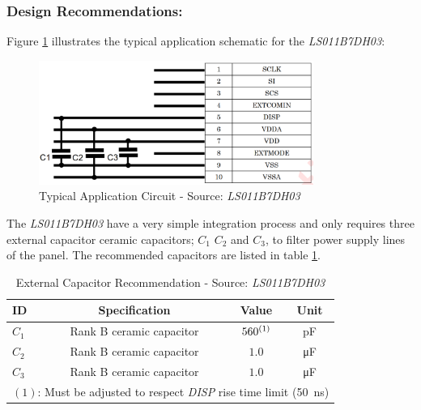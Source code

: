 \documentclass[report.tex]{subfiles}
\begin{document}
\subsubsection{Design Recommendations:}

Figure \ref{fig:LS011B7DH03_ext_capa} illustrates the typical application schematic for the \textit{LS011B7DH03}:

\begin{figure}[H]
	\centering
	\includegraphics[width=0.8\textwidth]{Include/Figure/comp/LS011B7DH03_ext_capa.png}
	\caption{Typical Application Circuit - Source: \textit{LS011B7DH03}\cite{LS011B7DH03}}
	\label{fig:LS011B7DH03_ext_capa}
\end{figure}

The \textit{LS011B7DH03} have a very simple integration process and only requires three external capacitor ceramic capacitors; $C_1$ $C_2$ and $C_3$, to filter power supply lines of the panel. The recommended capacitors are listed in table \ref{tab:LS011B7DH03_cap_recom_tab}.

\begin{table}[H]
\centering
\setlength{\extrarowheight}{2pt}
\begin{tabular}{|l|c|c|c|}\hline
\textbf{ID} & \textbf{Specification} & \textbf{Value} & \textbf{Unit} \\\hline
$C_1$ & Rank B ceramic capacitor & $560^{\tiny(1)}$ & \si{\pico\farad}\\\hline
$C_2$ & Rank B ceramic capacitor & $1.0$ & \si{\micro\farad}\\\hline
$C_3$ & Rank B ceramic capacitor & $1.0$ & \si{\micro\farad}\\\hline
\multicolumn{4}{c}{\footnotesize $(1)$: Must be adjusted to respect \textit{DISP} rise time limit (\SI{50}{\nano\second})}
\end{tabular}
\caption{External Capacitor Recommendation - Source: \textit{LS011B7DH03}\cite{LS011B7DH03}}
\label{tab:LS011B7DH03_cap_recom_tab}
\end{table}
\end{document}
